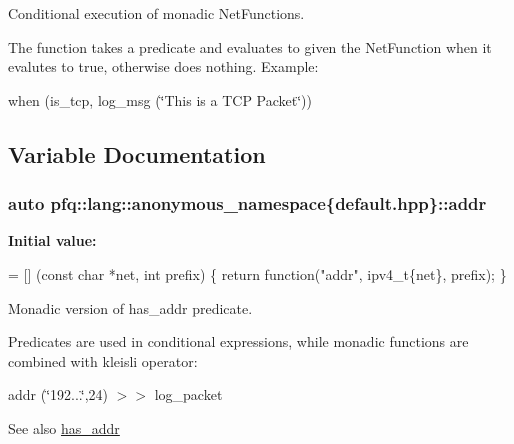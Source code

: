 Conditional execution of monadic Net\+Functions. 

The function takes a predicate and evaluates to given the Net\+Function when it evalutes to {\ttfamily true}, otherwise does nothing. Example\+:

when (is\+\_\+tcp, log\+\_\+msg (\char`\"{}\+This is a T\+C\+P Packet\char`\"{})) 

\subsection{Variable Documentation}
\subsubsection[{\texorpdfstring{addr}{addr}}]{\setlength{\rightskip}{0pt plus 5cm}auto pfq\+::lang\+::anonymous\+\_\+namespace\{default.\+hpp\}\+::addr}\hypertarget{namespacepfq_1_1lang_1_1anonymous__namespace_02default_8hpp_03_a13cabe468839119d8d68540e3c60718b}{}\label{namespacepfq_1_1lang_1_1anonymous__namespace_02default_8hpp_03_a13cabe468839119d8d68540e3c60718b}
{\bfseries Initial value\+:}
\begin{DoxyCode}
= [] (\textcolor{keyword}{const} \textcolor{keywordtype}{char} *net, \textcolor{keywordtype}{int} prefix)
        \{
            \textcolor{keywordflow}{return} \textcolor{keyword}{function}(\textcolor{stringliteral}{"addr"}, ipv4\_t\{net\}, prefix);
        \}
\end{DoxyCode}


Monadic version of {\ttfamily has\+\_\+addr} predicate. 

Predicates are used in conditional expressions, while monadic functions are combined with kleisli operator\+:

addr (\char`\"{}192...\char`\"{},24) $>$$>$ log\+\_\+packet

\begin{DoxySeeAlso}{See also}
\hyperlink{namespacepfq_1_1lang_1_1anonymous__namespace_02default_8hpp_03_a74c6b7e812fb3d312ebf534960a6a91d}{has\+\_\+addr} 
\end{DoxySeeAlso}
